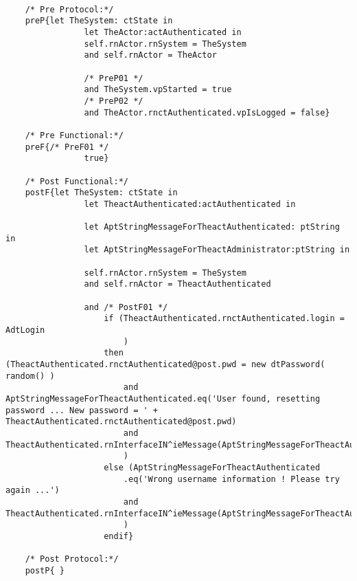 	\scriptsize
	\vspace{0.5cm}
	\begin{lstlisting}[style=MessirStyle,firstnumber=auto,captionpos=b,caption={\msrmessir (MCL-oriented) specification of the operation \emph{oeResetPassword}.},label=OM-actAuthenticated-oeResetPassword-MCL-LST]

	/* Pre Protocol:*/ 
	preP{let TheSystem: ctState in
				let TheActor:actAuthenticated in
				self.rnActor.rnSystem = TheSystem
				and self.rnActor = TheActor
				
				/* PreP01 */
				and TheSystem.vpStarted = true
				/* PreP02 */
				and TheActor.rnctAuthenticated.vpIsLogged = false}
	
	/* Pre Functional:*/
	preF{/* PreF01 */
				true}
	
	/* Post Functional:*/ 
	postF{let TheSystem: ctState in
				let TheactAuthenticated:actAuthenticated in
				
				let AptStringMessageForTheactAuthenticated: ptString in
				let AptStringMessageForTheactAdministrator:ptString in
				
				self.rnActor.rnSystem = TheSystem
				and self.rnActor = TheactAuthenticated
				
				and /* PostF01 */
					if (TheactAuthenticated.rnctAuthenticated.login = AdtLogin
						)
					then (TheactAuthenticated.rnctAuthenticated@post.pwd = new dtPassword( random() )
						and AptStringMessageForTheactAuthenticated.eq('User found, resetting password ... New password = ' + TheactAuthenticated.rnctAuthenticated@post.pwd)
						and TheactAuthenticated.rnInterfaceIN^ieMessage(AptStringMessageForTheactAuthenticated)
						)
					else (AptStringMessageForTheactAuthenticated
						.eq('Wrong username information ! Please try again ...')
						and TheactAuthenticated.rnInterfaceIN^ieMessage(AptStringMessageForTheactAuthenticated)
						)
					endif}
	
	/* Post Protocol:*/ 
	postP{ }
	
	\end{lstlisting}
	\normalsize 
	
	
	
	





